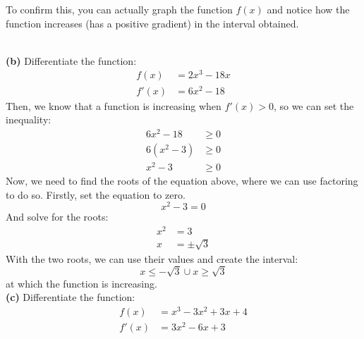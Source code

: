 \documentclass[hidelinks, a4paper, 12pt]{article}
\newcommand{\bd}{\textbf}
\newcommand{\n}{\\[\baselineskip]}
\begin{document}
                To confirm this, you can actually graph the function $f(x)$ and notice how the function increases (has a positive gradient) in the interval obtained.\n
                \n
                \bd{(b)} Differentiate the function:
                \[\begin{split}
                    f(x) &= 2x^3 - 18x\\
                    f'(x) &= 6x^2 - 18
                \end{split}\]
                Then, we know that a function is increasing when $f'(x) > 0$, so we can set the inequality:
                \[\begin{split}
                    6x^2 - 18 &\geq 0\\
                    6(x^2 - 3) &\geq 0\\
                    x^2 - 3 &\geq 0
                \end{split}\]
                Now, we need to find the roots of the equation above, where we can use factoring to do so. Firstly, set
                the equation to zero.
                \[x^2 - 3 = 0\]
                And solve for the roots:
                \[\begin{split}
                    x^2 &= 3\\
                    x &= \pm \sqrt{3}
                \end{split}\]
                With the two roots, we can use their values and create the interval:
                \[x \leq - \sqrt{3} \cup x \geq \sqrt{3}\]
                at which the function is increasing.\n
                \bd{(c)} Differentiate the function:
                \[\begin{split}
                    f(x) &= x^3 - 3x^2 + 3x + 4\\
                    f'(x) &= 3x^2 - 6x + 3
                \end{split}\]
\end{document}
